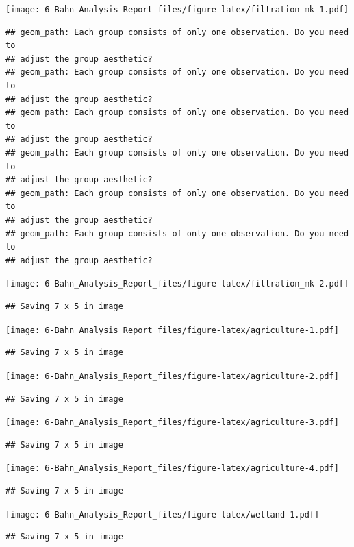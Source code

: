 \documentclass[]{article}
\begin{document}
\texttt{[image: 6-Bahn\_Analysis\_Report\_files/figure-latex/filtration\_mk-1.pdf]}

\begin{verbatim}
## geom_path: Each group consists of only one observation. Do you need to
## adjust the group aesthetic?
## geom_path: Each group consists of only one observation. Do you need to
## adjust the group aesthetic?
## geom_path: Each group consists of only one observation. Do you need to
## adjust the group aesthetic?
## geom_path: Each group consists of only one observation. Do you need to
## adjust the group aesthetic?
## geom_path: Each group consists of only one observation. Do you need to
## adjust the group aesthetic?
## geom_path: Each group consists of only one observation. Do you need to
## adjust the group aesthetic?
\end{verbatim}

\texttt{[image: 6-Bahn\_Analysis\_Report\_files/figure-latex/filtration\_mk-2.pdf]}

\begin{verbatim}
## Saving 7 x 5 in image
\end{verbatim}

\texttt{[image: 6-Bahn\_Analysis\_Report\_files/figure-latex/agriculture-1.pdf]}

\begin{verbatim}
## Saving 7 x 5 in image
\end{verbatim}

\texttt{[image: 6-Bahn\_Analysis\_Report\_files/figure-latex/agriculture-2.pdf]}

\begin{verbatim}
## Saving 7 x 5 in image
\end{verbatim}

\texttt{[image: 6-Bahn\_Analysis\_Report\_files/figure-latex/agriculture-3.pdf]}

\begin{verbatim}
## Saving 7 x 5 in image
\end{verbatim}

\texttt{[image: 6-Bahn\_Analysis\_Report\_files/figure-latex/agriculture-4.pdf]}

\begin{verbatim}
## Saving 7 x 5 in image
\end{verbatim}

\texttt{[image: 6-Bahn\_Analysis\_Report\_files/figure-latex/wetland-1.pdf]}

\begin{verbatim}
## Saving 7 x 5 in image
\end{verbatim}
\end{document}
